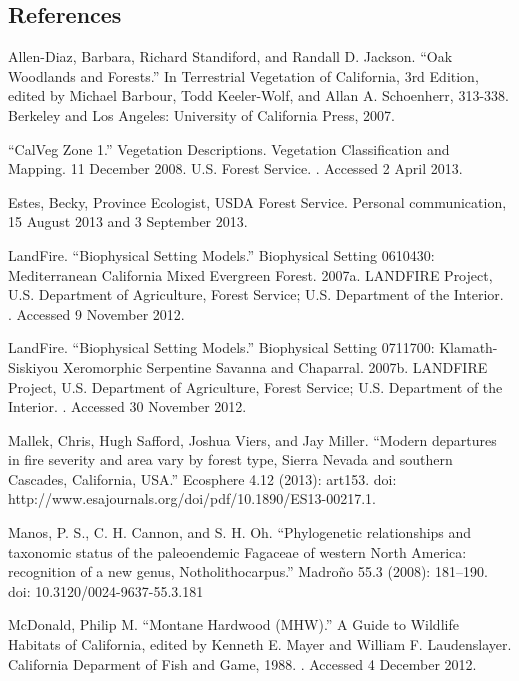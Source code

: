 \subsection*{References}
\begin{hangparas}{.25in}{1} 
Allen-Diaz, Barbara, Richard Standiford, and Randall D. Jackson. ``Oak Woodlands and Forests.'' In Terrestrial Vegetation of California, 3rd Edition, edited by Michael Barbour, Todd Keeler-Wolf, and Allan A. Schoenherr, 313-338. Berkeley and Los Angeles: University of California Press, 2007. 

``CalVeg Zone 1.'' Vegetation Descriptions. Vegetation Classification and Mapping.  11 December 2008. U.S. Forest Service. . Accessed 2 April 2013.

Estes, Becky, Province Ecologist, USDA Forest Service. Personal communication, 15 August 2013 and 3 September 2013.

LandFire. ``Biophysical Setting Models.'' Biophysical Setting 0610430: Mediterranean California Mixed Evergreen Forest. 2007a. LANDFIRE Project, U.S. Department of Agriculture, Forest Service; U.S. Department of the Interior. . Accessed 9 November 2012.

LandFire. ``Biophysical Setting Models.'' Biophysical Setting 0711700: Klamath-Siskiyou Xeromorphic Serpentine Savanna and Chaparral. 2007b. LANDFIRE Project, U.S. Department of Agriculture, Forest Service; U.S. Department of the Interior. . Accessed 30 November 2012.

Mallek, Chris, Hugh Safford, Joshua Viers, and Jay Miller. ``Modern departures in fire severity and area vary by forest type, Sierra Nevada and southern Cascades, California, USA.'' Ecosphere 4.12 (2013): art153. doi: http://www.esajournals.org/doi/pdf/10.1890/ES13-00217.1. 

Manos, P. S., C. H. Cannon, and S. H. Oh. ``Phylogenetic relationships and taxonomic status of the paleoendemic Fagaceae of western North America: recognition of a new genus, Notholithocarpus.'' Madroño 55.3 (2008): 181–190. doi: 10.3120/0024-9637-55.3.181

McDonald, Philip M. ``Montane Hardwood (MHW).'' A Guide to Wildlife Habitats of California, edited by Kenneth E. Mayer and William F. Laudenslayer. California Deparment of Fish and Game, 1988. . Accessed 4 December 2012.


\end{hangparas}
